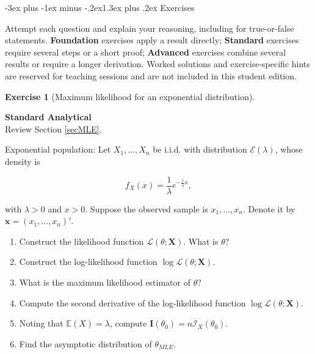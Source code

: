\documentclass[
  11pt,
]{book}
\makeatletter
\renewcommand\section{\@startsection{section}{1}{\z@}
  {-3ex plus -1ex minus -.2ex}{1.3ex plus .2ex}
  {\normalfont\Large\bfseries\color{TextbookInk}}}
\theoremstyle{definition}
\theoremstyle{definition}
\theoremstyle{definition}
\newtheorem{exercise}{Exercise}[chapter]
\theoremstyle{definition}
\theoremstyle{remark}
\makeatother
\begin{document}
\clearpage

\section{Exercises}\label{estimation-exercises}

Attempt each question and explain your reasoning, including for true-or-false statements. \textbf{Foundation} exercises apply a result directly; \textbf{Standard} exercises require several steps or a short proof; \textbf{Advanced} exercises combine several results or require a longer derivation. Worked solutions and exercise-specific hints are reserved for teaching sessions and are not included in this student edition.


\begin{exercisebox}

\begin{exercise}[Maximum likelihood for an exponential distribution]
\protect\hypertarget{exr:estimation-mle-exponential}{}\label{exr:estimation-mle-exponential}

\textbf{Standard \textbar{} Analytical}\\
Review Section \ref{secMLE}.

Exponential population: Let \(X_1,\dots,X_n\) be i.i.d. with distribution \(\mathcal{E}(\lambda)\), whose density is

\[f_X(x) = \frac{1}{\lambda} e^{-\frac{1}{\lambda}x},\]

with \(\lambda > 0\) and \(x>0\). Suppose the observed sample is \(x_1,\dots,x_n\). Denote it by \(\mathbf{x}=(x_1,\dots,x_n)'\).

\begin{enumerate}
\def\labelenumi{\arabic{enumi}.}
\item
  Construct the likelihood function \(\mathcal{L}(\theta; \mathbf{X})\). What is \(\theta\)?
\item
  Construct the log-likelihood function \(\log \mathcal{L}(\theta; \mathbf{X})\).
\item
  What is the maximum likelihood estimator of \(\theta\)?
\item
  Compute the second derivative of the log-likelihood function \(\log \mathcal{L}(\theta; \mathbf{X})\).
\item
  Noting that \(\mathbb{E}(X) = \lambda\), compute \(\mathbf{I}(\theta_0) = n\mathcal{I}_X(\theta_0)\).
\item
  Find the asymptotic distribution of \(\theta_{MLE}\).
\end{enumerate}

\end{exercise}

\end{exercisebox}
\end{document}
